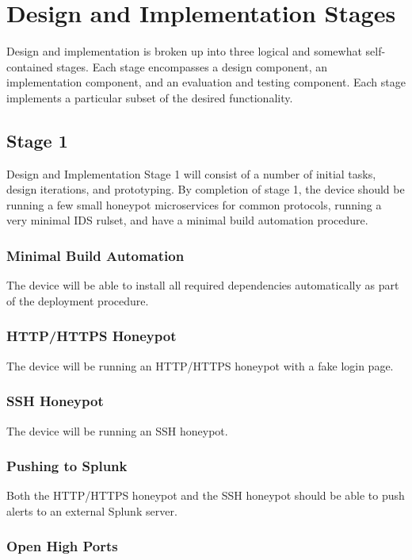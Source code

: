 \section{Design and Implementation Stages}

Design and implementation is broken up into three logical and somewhat
self-contained stages. Each stage encompasses a design component, an
implementation component, and an evaluation and testing component. Each stage
implements a particular subset of the desired functionality.

\subsection{Stage 1}

Design and Implementation Stage 1 will consist of a number of initial tasks,
design iterations, and prototyping. By completion of stage 1, the device
should be running a few small honeypot microservices for common protocols,
running a very minimal IDS rulset, and have a minimal build automation
procedure.

\subsubsection{Minimal Build Automation}

The device will be able to install all required dependencies automatically
as part of the deployment procedure.

\subsubsection{HTTP/HTTPS Honeypot}

The device will be running an HTTP/HTTPS honeypot with a fake login page.

\subsubsection{SSH Honeypot}

The device will be running an SSH honeypot.

\subsubsection{Pushing to Splunk}

Both the HTTP/HTTPS honeypot and the SSH honeypot should be able to push
alerts to an external Splunk server.

\subsubsection{Open High Ports}


